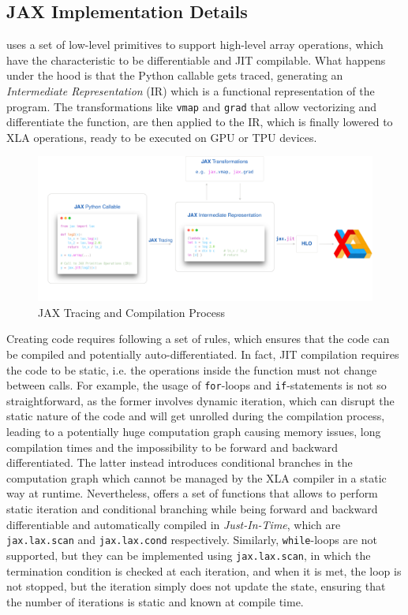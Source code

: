 \subsection{JAX Implementation Details}

\jax uses a set of low-level primitives to support high-level array operations, which have the characteristic to be differentiable and \ac{JIT} compilable. What happens under the hood is that the Python callable gets traced, generating an \textit{Intermediate Representation} (\jax IR) which is a functional representation of the program. The \jax transformations like \texttt{vmap} and \texttt{grad} that allow vectorizing and differentiate the function, are then applied to the \jax IR, which is finally lowered to \ac{XLA} operations, ready to be executed on \ac{GPU} or \ac{TPU} devices.


\begin{figure}
    \centering
    \caption{JAX Tracing and Compilation Process}
    \includegraphics[width=\textwidth]{Images/jax_compute_graph_short.png}
\end{figure}

Creating \jax code requires following a set of rules, which ensures that the code can be compiled and potentially auto-differentiated. In fact, \ac{JIT} compilation requires the code to be static, i.e. the operations inside the function must not change between calls.
For example, the usage of \texttt{for}-loops and \texttt{if}-statements is not so straightforward, as the former involves dynamic iteration, which can disrupt the static nature of the code and will get unrolled during the compilation process, leading to a potentially huge computation graph causing memory issues, long compilation times and the impossibility to be forward and backward differentiated. The latter instead introduces conditional branches in the computation graph which cannot be managed by the \ac{XLA} compiler in a static way at runtime. Nevertheless, \jax offers a set of functions that allows to perform static iteration and conditional branching while being forward and backward differentiable and automatically compiled in \textit{Just-In-Time}, which are \texttt{jax.lax.scan} and \texttt{jax.lax.cond} respectively. Similarly, \texttt{while}-loops are not supported, but they can be implemented using \texttt{jax.lax.scan}, in which the termination condition is checked at each iteration, and when it is met, the loop is not stopped, but the iteration simply does not update the state, ensuring that the number of iterations is static and known at compile time.

